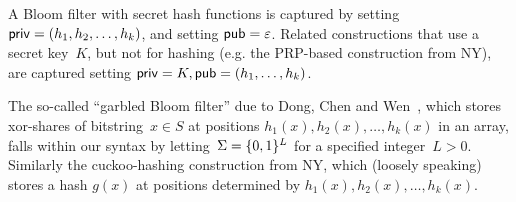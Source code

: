 A Bloom filter with secret hash functions is captured by setting
${\sf priv}=(h_1,h_2,\ldots,h_k)$, and setting ${\sf pub}=\varepsilon$.
Related constructions that use a secret key~$K$, but not for hashing (e.g. the PRP-based
construction from NY), are captured setting ${\sf priv}=K, {\sf pub}=(h_1, \ldots, h_k)$.

The so-called ``garbled Bloom filter'' due to Dong, Chen and Wen~\cite{xxx}, which stores xor-shares of bitstring~$x \in S$ at positions $h_1(x),h_2(x),\ldots,h_k(x)$ in an array, falls within our syntax by letting~$\Sigma=\{0,1\}^L$ for a specified integer~$L>0$.  Similarly the cuckoo-hashing construction from NY, which (loosely speaking) stores a hash $g(x)$ at positions determined by $h_1(x),h_2(x),\ldots,h_k(x)$. 
